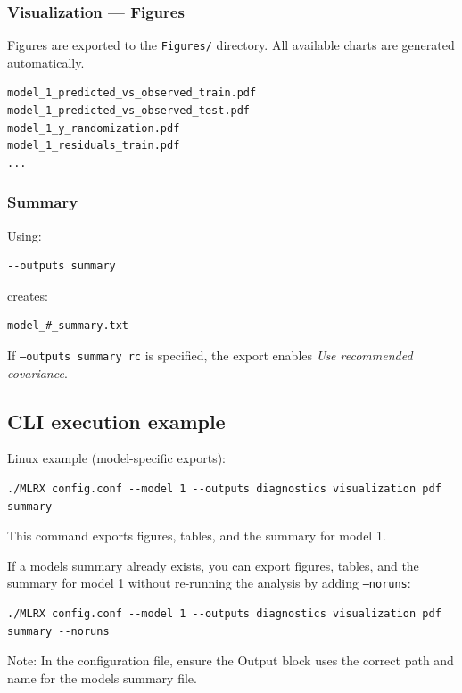 \documentclass[11pt,a4paper]{article}
\begin{document}
\subsubsection{Visualization --- Figures}

Figures are exported to the \texttt{Figures/} directory.  
All available charts are generated automatically.

\begin{lstlisting}[style=mlrx]
model_1_predicted_vs_observed_train.pdf
model_1_predicted_vs_observed_test.pdf
model_1_y_randomization.pdf
model_1_residuals_train.pdf
...
\end{lstlisting}

\subsubsection{Summary}

Using:

\begin{lstlisting}
--outputs summary
\end{lstlisting}

creates:

\begin{lstlisting}
model_#_summary.txt
\end{lstlisting}

If \texttt{--outputs summary rc} is specified, the export enables \emph{Use recommended covariance}.

\subsection{CLI execution example}
Linux example (model-specific exports):
\begin{lstlisting}[style=mlrx]
./MLRX config.conf --model 1 --outputs diagnostics visualization pdf summary
\end{lstlisting}
This command exports figures, tables, and the summary for model 1.

If a models summary already exists, you can export figures, tables, and the summary for model 1 without re-running the analysis by adding \texttt{--noruns}:
\begin{lstlisting}[style=mlrx]
./MLRX config.conf --model 1 --outputs diagnostics visualization pdf summary --noruns
\end{lstlisting}
Note: In the configuration file, ensure the Output block uses the correct path and name for the models summary file.
\end{document}
